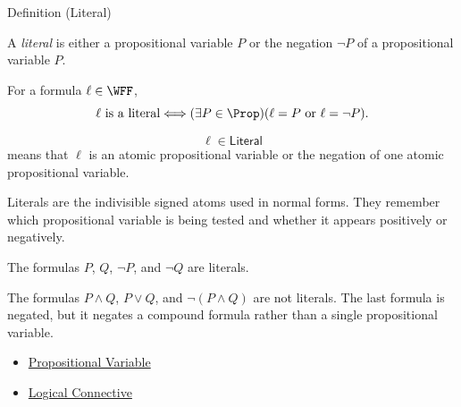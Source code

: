 \begin{definitionbox}{Definition (Literal)}
\begin{definition}[Literal]
\label{def:literal-propositional-logic}
A \emph{literal} is either a propositional variable \(P\) or the negation
\(\neg P\) of a propositional variable \(P\).
\end{definition}
\end{definitionbox}

\begin{remark*}
For a formula \(\ell\in\WFF\),
\[
\ell\text{ is a literal}
\Longleftrightarrow
(\exists P\in\Prop)(\ell=P\text{ or }\ell=\neg P).
\]
\end{remark*}

\begin{remark*}
\[
\ell\in\mathsf{Literal}
\]
means that \(\ell\) is an atomic propositional variable or the negation of one
atomic propositional variable.
\end{remark*}

\begin{remark*}[Interpretation]
Literals are the indivisible signed atoms used in normal forms. They remember
which propositional variable is being tested and whether it appears positively
or negatively.
\end{remark*}

\begin{remark*}[Examples]
The formulas \(P\), \(Q\), \(\neg P\), and \(\neg Q\) are literals.
\end{remark*}

\begin{remark*}
The formulas \(P\land Q\), \(P\lor Q\), and \(\neg(P\land Q)\) are not
literals. The last formula is negated, but it negates a compound formula rather
than a single propositional variable.
\end{remark*}

\begin{dependencies}
\begin{itemize}
  \item \hyperref[def:propositional-variable]{Propositional Variable}
  \item \hyperref[def:logical-connective]{Logical Connective}
\end{itemize}
\end{dependencies}


